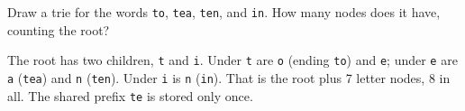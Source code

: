 \begin{Exercise}[title={Build a Trie}, label={ex:trie}]
Draw a trie for the words \texttt{to}, \texttt{tea}, \texttt{ten}, and
\texttt{in}. How many nodes does it have, counting the root?
\end{Exercise}
\begin{Answer}[ref={ex:trie}]
The root has two children, \texttt{t} and \texttt{i}. Under \texttt{t} are
\texttt{o} (ending \texttt{to}) and \texttt{e}; under \texttt{e} are
\texttt{a} (\texttt{tea}) and \texttt{n} (\texttt{ten}). Under \texttt{i}
is \texttt{n} (\texttt{in}). That is the root plus 7 letter nodes, 8 in
all. The shared prefix \texttt{te} is stored only once.
\end{Answer}
